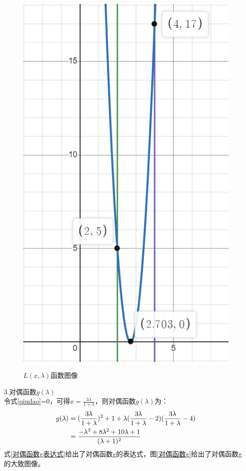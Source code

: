 \documentclass[12pt,a4paper]{ctexart}
\begin{document}
\begin{itemize}
\begin{figure}[!h]
{            \includegraphics[scale=0.5]{L(x,x_0).png}}
        \caption{$L(x,\lambda)$函数图像}
        \label{拉格朗日函数}
    \end{figure}
    3.对偶函数$g(\lambda)$\\
    令式\eqref{qiudao}=0，可得$x=\frac{3\lambda}{1+\lambda}$，则对偶函数$g(\lambda)$为：
    \begin{align}
        g(\lambda)&=(\frac{3\lambda}{1+\lambda})^2+1+\lambda(\frac{3\lambda}{1+\lambda}-2)(\frac{3\lambda}{1+\lambda}-4) \notag \\
                                &=\frac{-\lambda^3+8\lambda^2+10\lambda+1}{(\lambda+1)^2} \label{对偶函数g表达式}
    \end{align}
    式\eqref{对偶函数g表达式}给出了对偶函数g的表达式，图\ref{对偶函数g}给出了对偶函数g的大致图像。

\end{itemize}
\end{document}
